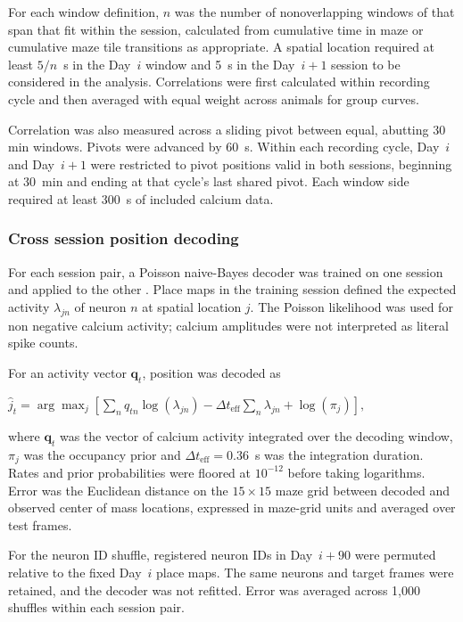 \documentclass[fleqn,10pt]{wlscirep}
\begin{document}
For each window definition, $n$ was the number of nonoverlapping windows of that span that fit within the session, calculated from cumulative time in maze or cumulative maze tile transitions as appropriate. A spatial location required at least $5/n$~s in the Day~$i$ window and 5~s in the Day~$i+1$ session to be considered in the analysis. Correlations were first calculated within recording cycle and then averaged with equal weight across animals for group curves.

Correlation was also measured across a sliding pivot between equal, abutting 30 min windows. Pivots were advanced by 60~s. Within each recording cycle, Day~$i$ and Day~$i+1$ were restricted to pivot positions valid in both sessions, beginning at 30~min and ending at that cycle's last shared pivot. Each window side required at least 300~s of included calcium data. 

\subsubsection*{Cross session position decoding}

For each session pair, a Poisson naive-Bayes decoder was trained on one session and applied to the other \cite{zhang_interpreting_1998}. Place maps in the training session defined the expected activity $\lambda_{jn}$ of neuron $n$ at spatial location $j$. The Poisson likelihood was used for non negative calcium activity; calcium amplitudes were not interpreted as literal spike counts.

For an activity vector $\mathbf q_t$, position was decoded as
\begin{center}
\(\widehat j_t=\arg\max_j\left[
\sum_n q_{tn}\log(\lambda_{jn})
-\Delta t_{\mathrm{eff}}\sum_n\lambda_{jn}
+\log(\pi_j)
\right],
\)
\end{center}
where $\mathbf q_t$ was the vector of calcium activity integrated over the decoding window, $\pi_j$ was the occupancy prior and $\Delta t_{\mathrm{eff}}=0.36$~s was the integration duration. Rates and prior probabilities were floored at $10^{-12}$ before taking logarithms. Error was the Euclidean distance on the $15\times15$ maze grid between decoded and observed center of mass locations, expressed in maze-grid units and averaged over test frames.

For the neuron ID shuffle, registered neuron IDs in Day~$i+90$ were permuted relative to the fixed Day~$i$ place maps. The same neurons and target frames were retained, and the decoder was not refitted. Error was averaged across 1,000 shuffles within each session pair. 
\end{document}
